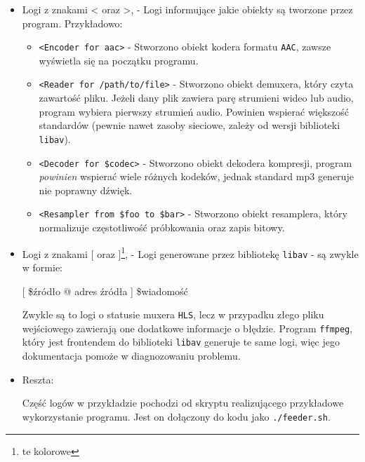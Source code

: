 \documentclass[a4paper,12pt]{article}
\begin{document}
\begin{itemize}
        \item Logi z znakami < oraz >, - Logi informujące jakie obiekty są
            tworzone przez program. Przykładowo:
            \begin{itemize}
                \item \texttt{<Encoder for aac>} - Stworzono obiekt kodera
                    formatu \texttt{AAC}, zawsze wyświetla się na początku
                    programu.
                \item \texttt{<Reader for /path/to/file>} - Stworzono obiekt
                    demuxera, który czyta zawartość pliku. Jeżeli dany plik
                    zawiera parę strumieni wideo lub audio, program wybiera
                    pierwszy strumień audio. Powinien wspierać większość
                    standardów (pewnie nawet zasoby sieciowe, zależy od wersji
                    biblioteki \texttt{libav}).
                \item \texttt{<Decoder for \$codec>} - Stworzono obiekt dekodera
                    kompresji, program \emph{powinien} wspierać wiele różnych
                    kodeków, jednak standard mp3 generuje nie poprawny dźwięk.
                \item \texttt{<Resampler from \$foo to \$bar>} - Stworzono
                    obiekt resamplera, który normalizuje częstotliwość
                    próbkowania oraz zapis bitowy.
            \end{itemize}
        \item Logi z znakami [ oraz ]\footnote{te kolorowe}, - Logi generowane przez bibliotekę
            \texttt{libav} - są zwykle w formie:

            \begin{center}
                [ \$źródło @ adres źródła ] \$wiadomość
            \end{center}
            
            Zwykle są to logi o statusie muxera \texttt{HLS}, lecz w przypadku
            złego pliku wejściowego zawierają one dodatkowe informacje o
            błędzie. Program \texttt{ffmpeg}, który jest frontendem do
            biblioteki \texttt{libav} generuje te same logi, więc jego
            dokumentacja pomoże w diagnozowaniu problemu.

        \item Reszta:

            Część logów w przykładzie pochodzi od skryptu realizującego
            przykładowe wykorzystanie programu. Jest on dołączony do kodu jako
            \texttt{./feeder.sh}.
\end{itemize}
\end{document}
